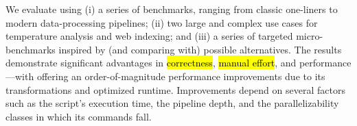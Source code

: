 \documentclass[letterpaper,twocolumn,10pt]{article}
\newcommand{\ttt}[1]{\texttt{#1}}
\newcommand{\todo}[1]{\hl{#1}\xspace}
\begin{document}

% 
% 

We evaluate \sys using
  (i) a series of benchmarks, ranging from classic \unix one-liners to modern data-processing pipelines;
  (ii) two large and complex use cases for temperature analysis and web indexing;
and 
  (iii) a series of targeted micro-benchmarks inspired by (and
comparing with) possible alternatives.  The results demonstrate
significant advantages in \todo{correctness}, \todo{manual effort},
and performance---with \sys offering an order-of-magnitude performance
improvements due to its transformations and optimized runtime.
Improvements depend on several factors such as the script's execution time, the pipeline depth, and the parallelizability classes in which its commands fall. 
\end{document}
